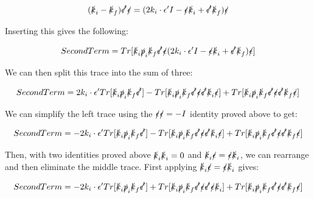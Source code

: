 \documentclass[a4]{article}
\begin{document}
    \begin{equation}
        (\slashed{k}_i - \slashed{k}_f) \slashed{\epsilon'} \slashed{\epsilon} = (2 k_i \cdot \epsilon' I - \slashed{\epsilon} \slashed{k}_i + \slashed{\epsilon'} \slashed{k}_f) \slashed{\epsilon}
    \end{equation}

    Inserting this gives the following:

    \begin{equation}
        Second Term = Tr [\slashed{k}_i \slashed{p}_i \slashed{k}_f \slashed{\epsilon'} \slashed{\epsilon} (2 k_i \cdot \epsilon' I - \slashed{\epsilon} \slashed{k}_i + \slashed{\epsilon'} \slashed{k}_f) \slashed{\epsilon}]
    \end{equation}

    We can then split this trace into the sum of three:

    \begin{equation}
        Second Term = 2 k_i \cdot \epsilon' Tr [ \slashed{k}_i \slashed{p}_i \slashed{k}_f \slashed{\epsilon'} ] - Tr[ \slashed{k}_i \slashed{p}_i \slashed{k}_f \slashed{\epsilon'} \slashed{\epsilon} \slashed{\epsilon'} \slashed{k}_i \slashed{\epsilon} ] + Tr[ \slashed{k}_i \slashed{p}_i \slashed{k}_f \slashed{\epsilon'} \slashed{\epsilon} \slashed{\epsilon'} \slashed{k}_f \slashed{\epsilon} ]
    \end{equation}

    We can simplify the left trace using the $\slashed{\epsilon} \slashed{\epsilon} = - I$ identity proved above to get:

    \begin{equation}
        Second Term = - 2 k_i \cdot \epsilon' Tr [ \slashed{k}_i \slashed{p}_i \slashed{k}_f \slashed{\epsilon'} ] - Tr[ \slashed{k}_i \slashed{p}_i \slashed{k}_f \slashed{\epsilon'} \slashed{\epsilon} \slashed{\epsilon'} \slashed{k}_i \slashed{\epsilon} ] + Tr[ \slashed{k}_i \slashed{p}_i \slashed{k}_f \slashed{\epsilon'} \slashed{\epsilon} \slashed{\epsilon'} \slashed{k}_f \slashed{\epsilon} ]
    \end{equation}

    Then, with two identities proved above $\slashed{k}_i \slashed{k}_i = 0$ and $\slashed{k}_i \slashed{\epsilon} = \slashed{\epsilon} \slashed{k}_i$, we can rearrange and then eliminate the middle trace. First applying 
    $\slashed{k}_i \slashed{\epsilon} = \slashed{\epsilon} \slashed{k}_i$ gives:

    \begin{equation}
        Second Term = - 2 k_i \cdot \epsilon' Tr [ \slashed{k}_i \slashed{p}_i \slashed{k}_f \slashed{\epsilon'} ] + Tr[ \slashed{k}_i \slashed{p}_i \slashed{k}_f \slashed{\epsilon'} \slashed{\epsilon} \slashed{\epsilon'} \slashed{\epsilon} \slashed{k}_i ] + Tr[ \slashed{k}_i \slashed{p}_i \slashed{k}_f \slashed{\epsilon'} \slashed{\epsilon} \slashed{\epsilon'} \slashed{k}_f \slashed{\epsilon} ]
    \end{equation}
\end{document}
